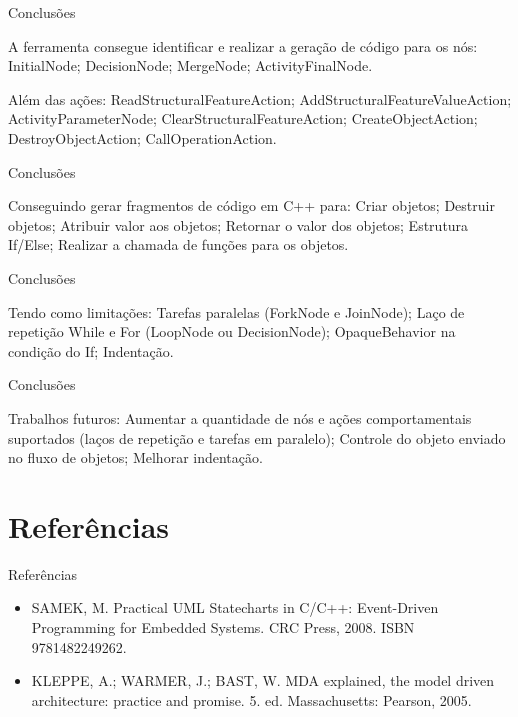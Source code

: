 \documentclass[handout,aspectratio = 169]{beamer}
\begin{document}
\begin{frame}{Conclusões}
    \begin{outline}
        \1 A ferramenta consegue identificar e realizar a geração de código para os nós:
        \2 InitialNode;
        \2 DecisionNode;
        \2 MergeNode;
        \2 ActivityFinalNode.

        \1 Além das ações:
        \2 ReadStructuralFeatureAction;
        \2 AddStructuralFeatureValueAction;
        \2 ActivityParameterNode;
        \2 ClearStructuralFeatureAction;
        \2 CreateObjectAction;
        \2 DestroyObjectAction;
        \2 CallOperationAction.
    \end{outline}
\end{frame}

\begin{frame}{Conclusões}
    \begin{outline}
        \1 Conseguindo gerar fragmentos de código em C++ para:
        \2 Criar objetos;
        \2 Destruir objetos;
        \2 Atribuir valor aos objetos;
        \2 Retornar o valor dos objetos;
        \2 Estrutura If/Else;
        \2 Realizar a chamada de funções para os objetos.
    \end{outline}
\end{frame}

\begin{frame}{Conclusões}
    \begin{outline}
        \1 Tendo como limitações:
        \2 Tarefas paralelas (ForkNode e JoinNode);
        \2 Laço de repetição While e For (LoopNode ou DecisionNode);
        \2 OpaqueBehavior na condição do If;
        \2 Indentação.
    \end{outline}
\end{frame}

\begin{frame}{Conclusões}

    \begin{outline}
        \1 Trabalhos futuros:
        \2 Aumentar a quantidade de nós e ações comportamentais suportados (laços de repetição e tarefas em paralelo);
        \2 Controle do objeto enviado no fluxo de objetos;
        \2 Melhorar indentação.
    \end{outline}
\end{frame}



\section{Referências}
\begin{frame}[t]{Referências}
    \begin{itemize}
        \item SAMEK, M. Practical UML Statecharts in C/C++: Event-Driven Programming for Embedded Systems. CRC Press, 2008. ISBN 9781482249262.
        \item KLEPPE, A.; WARMER, J.; BAST, W. MDA explained, the model driven architecture: practice and promise. 5. ed. Massachusetts: Pearson, 2005.
    \end{itemize}
\end{frame}
\end{document}
